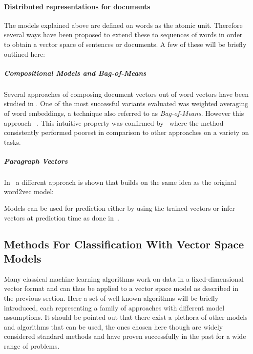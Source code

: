 \paragraph{Distributed representations for documents}
\label{par:Distributed representations for documents}

The models explained above are defined on words as the atomic unit. Therefore several ways have been proposed to extend these to sequences of words in order to obtain a vector space of sentences or documents. A few of these will be briefly outlined here:

\subparagraph{Compositional Models and Bag-of-Means}
\label{subp:Bag-of-Means}

Several approaches of composing document vectors out of word vectors have been studied in \cite{Mitchell:2010aa}. One of the most successful variants evaluated was weighted averaging of word embeddings, a technique also referred to as \emph{Bag-of-Means}. However this approach ~\cite{Le:2014aa}. This intuitive property was confirmed by~\cite{Zhang:2015aa} where the method consistently performed poorest in comparison to other approaches on a variety on tasks.

\subparagraph{Paragraph Vectors}
\label{subp:Paragraph Vectors}

In~\cite{Le:2014aa} a different approach is shown that builds on the same idea as the original word2vec model:

Models can be used for prediction either by using the trained vectors or infer vectors at prediction time as done in~\cite{Le:2014aa}.


\subsection{Methods For Classification With Vector Space Models}
\label{sub:Methods For Classification With Vector Space Models}

Many classical machine learning algorithms work on data in a fixed-dimensional vector format and can thus be applied to a vector space model as described in the previous section. Here a set of well-known algorithms will be briefly introduced, each representing a family of approaches with different model assumptions. It should be pointed out that there exist a plethora of other models and algorithms that can be used, the ones chosen here though are widely considered standard methods and have proven successfully in the past for a wide range of problems.

